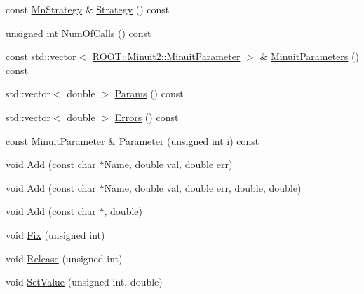 \begin{DoxyCompactItemize}
\item 
const \mbox{\hyperlink{classROOT_1_1Minuit2_1_1MnStrategy}{Mn\+Strategy}} \& \mbox{\hyperlink{classROOT_1_1Minuit2_1_1MnApplication_ad4eba6a0369cc3fa9ce9b676582a77a7}{Strategy}} () const
\item 
unsigned int \mbox{\hyperlink{classROOT_1_1Minuit2_1_1MnApplication_a089843f663ccb31fcca2e58016ec7e9d}{Num\+Of\+Calls}} () const
\item 
const std\+::vector$<$ \mbox{\hyperlink{classROOT_1_1Minuit2_1_1MinuitParameter}{R\+O\+O\+T\+::\+Minuit2\+::\+Minuit\+Parameter}} $>$ \& \mbox{\hyperlink{classROOT_1_1Minuit2_1_1MnApplication_a8ae2de0bd82d99a3ac28da32bcbe98ea}{Minuit\+Parameters}} () const
\item 
std\+::vector$<$ double $>$ \mbox{\hyperlink{classROOT_1_1Minuit2_1_1MnApplication_ae821bfc8bb4659bd3b01835c1d58387c}{Params}} () const
\item 
std\+::vector$<$ double $>$ \mbox{\hyperlink{classROOT_1_1Minuit2_1_1MnApplication_a0883d421b0b5fa90d5a9a9192a78e9f5}{Errors}} () const
\item 
const \mbox{\hyperlink{classROOT_1_1Minuit2_1_1MinuitParameter}{Minuit\+Parameter}} \& \mbox{\hyperlink{classROOT_1_1Minuit2_1_1MnApplication_aeb67b1d0ce5b357886d8413c3b166ef2}{Parameter}} (unsigned int i) const
\item 
void \mbox{\hyperlink{classROOT_1_1Minuit2_1_1MnApplication_a2912c94b7cb69b29862e1e41ffbc4542}{Add}} (const char $\ast$\mbox{\hyperlink{classROOT_1_1Minuit2_1_1MnApplication_ad333315ce51772fef3094491b37f309d}{Name}}, double val, double err)
\item 
void \mbox{\hyperlink{classROOT_1_1Minuit2_1_1MnApplication_afd0879fb1f21d49dd649698c1cd25e50}{Add}} (const char $\ast$\mbox{\hyperlink{classROOT_1_1Minuit2_1_1MnApplication_ad333315ce51772fef3094491b37f309d}{Name}}, double val, double err, double, double)
\item 
void \mbox{\hyperlink{classROOT_1_1Minuit2_1_1MnApplication_a67220ef54f4862a27490162b2f7cf832}{Add}} (const char $\ast$, double)
\item 
void \mbox{\hyperlink{classROOT_1_1Minuit2_1_1MnApplication_a98bea1ca3fb2a311b1c0e72a58ec2d9f}{Fix}} (unsigned int)
\item 
void \mbox{\hyperlink{classROOT_1_1Minuit2_1_1MnApplication_ab690313ed666d5a794a13b05054f5575}{Release}} (unsigned int)
\item 
void \mbox{\hyperlink{classROOT_1_1Minuit2_1_1MnApplication_af6147ded182dfe93c2200d621050c642}{Set\+Value}} (unsigned int, double)

\end{DoxyCompactItemize}
